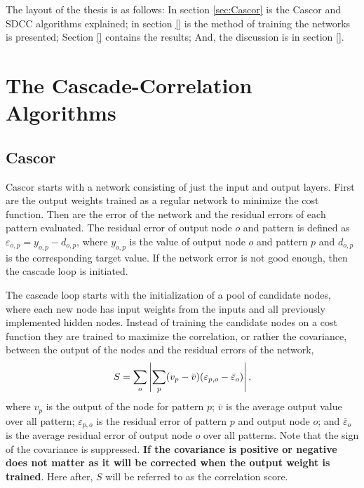 \documentclass[a4paper,11pt, usenatbib]{article}
\begin{document}

The layout of the thesis is as follows: In section \ref{sec:Cascor} is the Cascor and SDCC algorithms explained; in section \ref{} is  the method of training the networks is presented; Section \ref{} contains the results; And, the discussion is in section \ref{}.

\section{The Cascade-Correlation Algorithms} \label{sec:The Cascor-Correlation Algorithms}
\subsection{Cascor}
\label{ssec:Cascor}
Cascor starts with a network consisting of just the input and output layers. First are the output weights trained as a regular network to minimize the cost function. Then are the error of the network and the residual errors of each pattern evaluated. The residual error of output node $o$ and pattern is defined as $\varepsilon_{o,p}=y_{o,p}-d_{o,p}$, where $y_{o,p}$ is the value of output node $o$ and pattern $p$ and $d_{o,p}$ is the corresponding target value. If the network error is not good enough, then the cascade loop is initiated. 

The cascade loop starts with the initialization of a pool of candidate nodes, where each new node has input weights from the inputs and all previously implemented hidden nodes. Instead of training the candidate nodes on a cost function they are trained to maximize the correlation, or rather the covariance, between the output of the nodes and the residual errors of the network, 
\begin{equation}
\label{eq:Corr}
    S=\sum_o \left|\sum_p(v_p-\Bar{v})(\varepsilon_{p, o}-\bar{\varepsilon}_{o})\right|,
\end{equation}
where $v_p$ is the output of the node for pattern $p$; $\bar{v}$ is the average output value over all pattern; $\varepsilon_{p, o}$ is the residual error of pattern $p$ and output node $o$; and $\bar{\varepsilon}_{o}$ is the average residual error of output node $o$ over all patterns. Note that the sign of the covariance is suppressed. \textbf{If the covariance is positive or negative does not matter as it will be corrected when the output weight is trained}. Here after, $S$ will be referred to as the correlation score.
\end{document}
